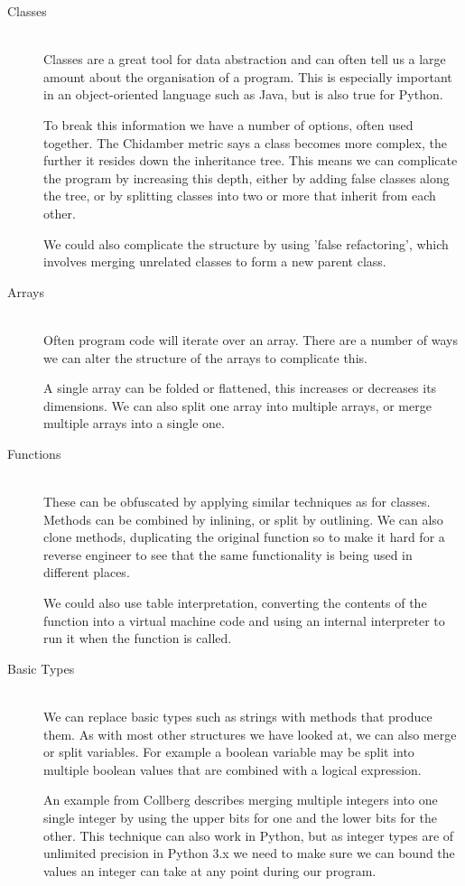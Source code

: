 \documentclass[twoside,a4paper]{report}
\begin{document}
\begin{description}
\item[Classes] \hfill \\
Classes are a great tool for data abstraction and can often tell us a large amount about the organisation of a program. This is
especially important in an object-oriented language such as Java, but is also true for Python.

To break this information we have a number of options, often used together. The Chidamber metric says a class becomes more complex,
the further it resides down the inheritance tree. This means we can complicate the program by increasing this depth, either by adding
false classes along the tree, or by splitting classes into two or more that inherit from each other.

We could also complicate the structure by using 'false refactoring', which involves merging unrelated classes to form a new parent
class.

\item[Arrays] \hfill \\
Often program code will iterate over an array. There are a number of ways we can alter the structure of the arrays to complicate
this.

A single array can be folded or flattened, this increases or decreases its dimensions. We can also split one array into multiple
arrays, or merge multiple arrays into a single one.

\item[Functions] \hfill \\
These can be obfuscated by applying similar techniques as for classes. Methods can be combined by inlining, or split by outlining.
We can also clone methods, duplicating the original function so to make it hard for a reverse engineer to see that the same
functionality is being used in different places.

We could also use table interpretation, converting the contents of the function into a virtual machine code and using an internal
interpreter to run it when the function is called.

\item[Basic Types] \hfill \\
We can replace basic types such as strings with methods that produce them. As with most other structures we have looked at, we can
also merge or split variables. For example a boolean variable may be split into multiple boolean values that are combined with a
logical expression.

An example from Collberg describes merging multiple integers into one single integer by using the upper bits for one and the lower
bits for the other. This technique can also work in Python, but as integer types are of unlimited precision \cite{intprec} in Python
3.x we need to make sure we can bound the values an integer can take at any point during our program.

\end{description}
\end{document}
